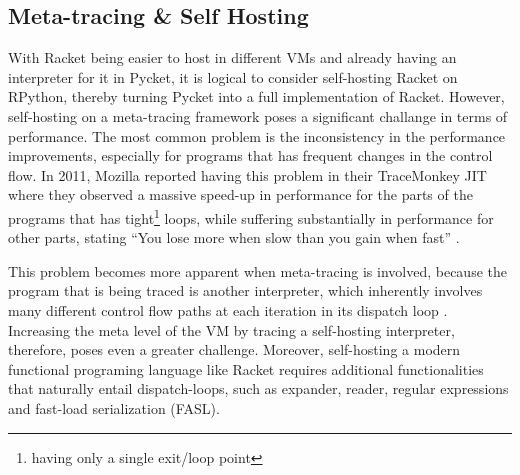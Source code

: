 \subsection{Meta-tracing \& Self Hosting}
\label{subsec:self-hosting-problem}

With Racket being easier to host in different VMs and already having
an interpreter for it in Pycket, it is logical to consider
self-hosting Racket on RPython, thereby turning Pycket into a full
implementation of Racket. However, self-hosting on a meta-tracing
framework poses a significant challange in terms of performance. The
most common problem is the inconsistency in the performance
improvements, especially for programs that has frequent changes in the
control flow. In 2011, Mozilla reported having this problem in their
TraceMonkey JIT where they observed a massive speed-up in performance
for the parts of the programs that has tight\footnote{having only a
  single exit/loop point} loops, while suffering substantially in
performance for other parts, stating ``You lose more when slow than
you gain when fast'' \cite{mozblog}.

This problem becomes more apparent when meta-tracing is involved,
because the program that is being traced is another interpreter, which
inherently involves many different control flow paths at each
iteration in its dispatch loop \cite{bolz15-meta-vm}. Increasing the
meta level of the VM by tracing a self-hosting interpreter, therefore,
poses even a greater challenge. Moreover, self-hosting a modern
functional programing language like Racket requires additional
functionalities that naturally entail dispatch-loops, such as
expander, reader, regular expressions and fast-load serialization
(FASL).
